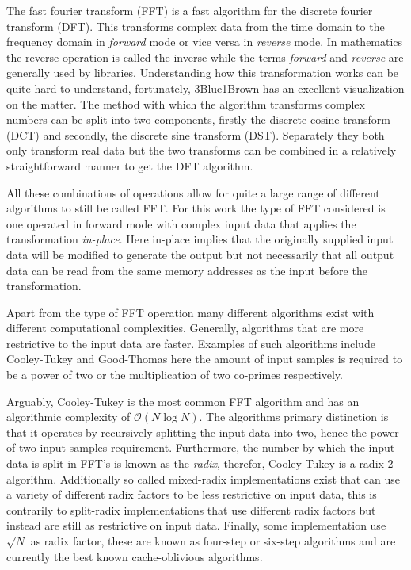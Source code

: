 \documentclass[conference]{IEEEtran}
\begin{document}
The fast fourier transform (FFT) is a fast algorithm for the discrete fourier
transform (DFT). This transforms complex data from the time domain to the
frequency domain in \textit{forward} mode or vice versa in \textit{reverse}
mode. In mathematics the reverse operation is called the inverse while the
terms \textit{forward} and \textit{reverse} are generally used by libraries.
Understanding how this transformation works can be quite hard to understand,
fortunately, 3Blue1Brown has an excellent visualization on the
matter\cite{fft-visualize}. The method with which the algorithm transforms 
complex numbers can be split into two components, firstly the discrete cosine
transform (DCT) and secondly, the discrete sine transform (DST). Separately
they both only transform real data but the two transforms can be combined in a
relatively straightforward manner to get the DFT algorithm.

All these combinations of operations allow for quite a large range of different
algorithms to still be called FFT. For this work the type of FFT considered is
one operated in forward mode with complex input data that applies the
transformation \textit{in-place}\footnotemark[8]. Here in-place implies that
the originally supplied input data will be modified to generate the output but
not necessarily that all output data can be read from the same memory addresses
as the input before the transformation.


Apart from the type of FFT operation many different algorithms exist with
different computational complexities. Generally, algorithms that are more
restrictive to the input data are faster. Examples of such algorithms include
Cooley-Tukey\cite{Cooley1965} and Good-Thomas\cite{good-thomas} here the amount
of input samples is required to be a power of two or the multiplication of two
co-primes respectively.

Arguably, Cooley-Tukey is the most common FFT algorithm and has an algorithmic
complexity of $\mathcal{O}(N\log N)$. The algorithms primary distinction is
that it operates by recursively splitting the input data into two, hence the
power of two input samples requirement. Furthermore, the number by which the
input data is split in FFT's is known as the \textit{radix}, therefor,
Cooley-Tukey is a radix-2 algorithm. Additionally so called mixed-radix
implementations exist that can use a variety of different radix factors to be
less restrictive on input data, this is contrarily to split-radix
implementations that use different radix factors but instead are still as
restrictive on input data. Finally, some implementation use $\sqrt{N}$ as radix
factor, these are known as four-step or six-step algorithms and are currently
the best known cache-oblivious algorithms\cite{fast-fourier-cache}.
\end{document}

